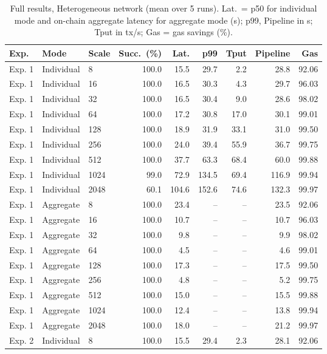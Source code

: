 \begin{table}[!t]
\centering
\scriptsize
\caption{Full results, Heterogeneous network (mean over 5 runs). Lat.\ = p50 for individual mode and on-chain aggregate latency for aggregate mode (s); p99, Pipeline in s; Tput in tx/s; Gas = gas savings (\%).}
\label{tab:full-heterogeneous}
\begin{tabular}{@{}lllrrrrrr@{}}
\toprule
Exp. & Mode & Scale & Succ.\ (\%) & Lat. & p99 & Tput & Pipeline & Gas \\
\midrule
Exp. 1 & Individual & 8 & 100.0 & 15.5 & 29.7 & 2.2 & 28.8 & 92.06 \\
Exp. 1 & Individual & 16 & 100.0 & 16.5 & 30.3 & 4.3 & 29.7 & 96.03 \\
Exp. 1 & Individual & 32 & 100.0 & 16.5 & 30.4 & 9.0 & 28.6 & 98.02 \\
Exp. 1 & Individual & 64 & 100.0 & 17.2 & 30.8 & 17.0 & 30.1 & 99.01 \\
Exp. 1 & Individual & 128 & 100.0 & 18.9 & 31.9 & 33.1 & 31.0 & 99.50 \\
Exp. 1 & Individual & 256 & 100.0 & 24.0 & 39.4 & 55.9 & 36.7 & 99.75 \\
Exp. 1 & Individual & 512 & 100.0 & 37.7 & 63.3 & 68.4 & 60.0 & 99.88 \\
Exp. 1 & Individual & 1024 & 99.0 & 72.9 & 134.5 & 69.4 & 116.9 & 99.94 \\
Exp. 1 & Individual & 2048 & 60.1 & 104.6 & 152.6 & 74.6 & 132.3 & 99.97 \\
\addlinespace[2pt]
Exp. 1 & Aggregate & 8 & 100.0 & 23.4 & -- & -- & 23.5 & 92.06 \\
Exp. 1 & Aggregate & 16 & 100.0 & 10.7 & -- & -- & 10.7 & 96.03 \\
Exp. 1 & Aggregate & 32 & 100.0 & 9.8 & -- & -- & 9.9 & 98.02 \\
Exp. 1 & Aggregate & 64 & 100.0 & 4.5 & -- & -- & 4.6 & 99.01 \\
Exp. 1 & Aggregate & 128 & 100.0 & 17.3 & -- & -- & 17.5 & 99.50 \\
Exp. 1 & Aggregate & 256 & 100.0 & 4.8 & -- & -- & 5.2 & 99.75 \\
Exp. 1 & Aggregate & 512 & 100.0 & 15.0 & -- & -- & 15.5 & 99.88 \\
Exp. 1 & Aggregate & 1024 & 100.0 & 12.4 & -- & -- & 13.8 & 99.94 \\
Exp. 1 & Aggregate & 2048 & 100.0 & 18.0 & -- & -- & 21.2 & 99.97 \\
\addlinespace[2pt]
Exp. 2 & Individual & 8 & 100.0 & 15.5 & 29.4 & 2.3 & 28.1 & 92.06 \\

\end{tabular}
\end{table}
